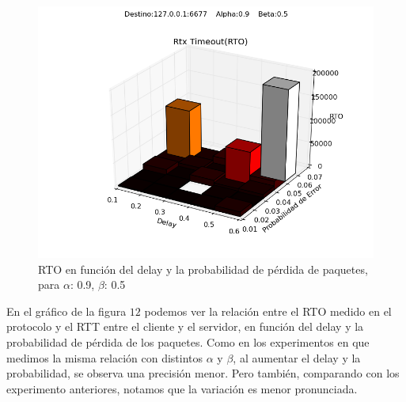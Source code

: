 \begin{figure}[H]
  \centering	
	\includegraphics[scale=0.5]{../analisis/graficos_tablas/graficos_en_funcion_de_delay_probaerror/0.9-0.5/rto.png}
  \caption{RTO en función del delay y la probabilidad de pérdida de paquetes, para $\alpha$: 0.9, $\beta$: 0.5}
	\label{fig:histo-src-sitiotrabajo}
\end{figure}

En el gráfico de la figura $12$ podemos ver la relación entre el RTO medido en el protocolo y el RTT entre el cliente y el servidor, en función del delay y la probabilidad de pérdida de los paquetes. Como en los experimentos en que medimos la misma relación con distintos $\alpha$ y $\beta$, al aumentar el delay y la probabilidad, se observa una precisión menor. Pero también, comparando con los experimento anteriores, notamos que la variación es menor pronunciada.

